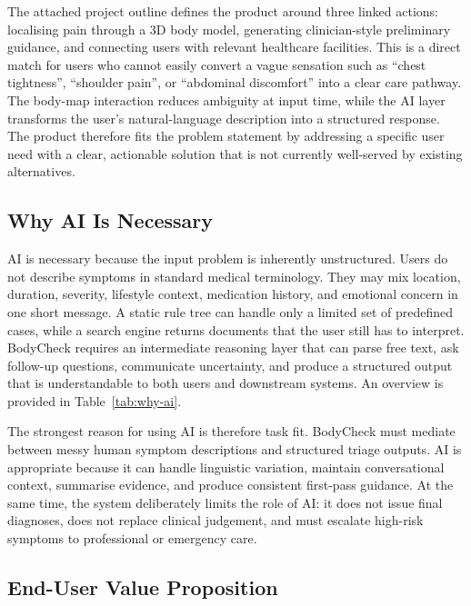 The attached project outline defines the product around three linked actions:
localising pain through a 3D body model, generating clinician-style preliminary
guidance, and connecting users with relevant healthcare facilities. This is a
direct match for users who cannot easily convert a vague sensation such as
``chest tightness'', ``shoulder pain'', or ``abdominal discomfort'' into a clear
care pathway. The body-map interaction reduces ambiguity at input time, while
the AI layer transforms the user's natural-language description into a
structured response. The product therefore fits the problem statement by addressing a specific user need with a clear, actionable solution that is not currently well-served by existing alternatives.

\subsection{Why AI Is Necessary}
\label{sec:problem-fit-why-ai}

AI is necessary because the input problem is inherently unstructured. Users do
not describe symptoms in standard medical terminology. They may mix location,
duration, severity, lifestyle context, medication history, and emotional concern
in one short message. A static rule tree can handle only a limited set of
predefined cases, while a search engine returns documents that the user still
has to interpret. BodyCheck requires an intermediate reasoning layer that can
parse free text, ask follow-up questions, communicate uncertainty, and produce
a structured output that is understandable to both users and downstream systems. An overview is provided in Table~\ref{tab:why-ai}.


The strongest reason for using AI is therefore task fit. BodyCheck must mediate between messy human symptom descriptions and
structured triage outputs. AI is appropriate because it can handle linguistic
variation, maintain conversational context, summarise evidence, and produce
consistent first-pass guidance. At the same time, the system deliberately
limits the role of AI: it does not issue final diagnoses, does not replace
clinical judgement, and must escalate high-risk symptoms to professional or
emergency care.

\subsection{End-User Value Proposition}
\label{sec:problem-fit-value}


